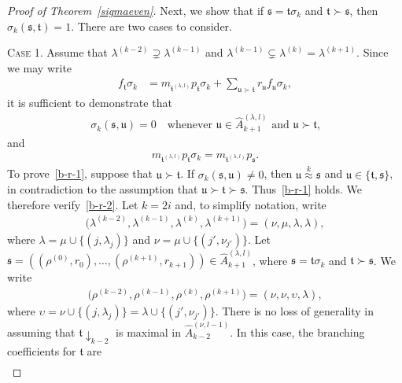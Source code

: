 \documentclass[11pt,a4paper,reqno,svgnames]{amsart}
\theoremstyle{plain}
\theoremstyle{definition}
\numberwithin{equation}{section}
\begin{document}
\begin{proof}[Proof of Theorem~\ref{sigmaeven}]
Next, we show that if $\mathfrak{s}=\mathfrak{t}\sigma_{k}$ and $\mathfrak{t}\succ\mathfrak{s}$, then $\sigma_{k}(\mathfrak{s},\mathfrak{t})=1$. There are two cases to consider.

{\textsc{Case 1.}} Assume that $\lambda^{(k-2)}\supsetneq\lambda^{(k-1)}$ and $\lambda^{(k-1)}\subsetneq\lambda^{(k)}=\lambda^{(k+1)}$. Since we may write
\begin{align*}
f_\mathfrak{t} \sigma_{k}&=
m_{\mathfrak{t}^{(\lambda,l)}} p_\mathfrak{t}\sigma_{k}+
\sum_{\mathfrak{u}\succ\mathfrak{t}}r_\mathfrak{u}f_\mathfrak{u} \sigma_{k},
\end{align*}
it is sufficient to demonstrate that
\begin{align}\label{b-r-1}
\sigma_{k}(\mathfrak{s,u})=0
\quad\text{whenever $\mathfrak{u}\in\hat{A}_{k+1}^{(\lambda, l )}$ and $\mathfrak{u}\succ\mathfrak{t}$,}
\end{align}
and 
\begin{align}\label{b-r-2}
m_{\mathfrak{t}^{(\lambda,l)}} p_\mathfrak{t}\sigma_{k}=
m_{\mathfrak{t}^{(\lambda,l)}} p_\mathfrak{s}.
\end{align}
To prove~\eqref{b-r-1}, suppose that $\mathfrak{u}\succ\mathfrak{t}$. If $\sigma_{k}(\mathfrak{s},\mathfrak{u})\ne0$, then $\mathfrak{u}\stackrel{k}{\approx}\mathfrak{s}$ and  $\mathfrak{u}\in{\lbrace}\mathfrak{t},\mathfrak{s}{\rbrace}$, in contradiction to the assumption that  $\mathfrak{u}\succ\mathfrak{t}\succ\mathfrak{s}$. Thus~\eqref{b-r-1} holds. We therefore verify~\eqref{b-r-2}. Let $k=2i$ and, to simplify notation, write 
\begin{align*} 
\big(\lambda^{(k-2)},\lambda^{(k-1)},\lambda^{(k)},\lambda^{(k+1)}\big)=(\nu,\mu,\lambda,\lambda),
\end{align*}
where $\lambda=\mu\cup{\lbrace}(j,\lambda_j){\rbrace}$ and $\nu=\mu\cup{\lbrace}({j'},\nu_{j'}){\rbrace}$. Let $\mathfrak{s}=((\rho^{(0)},r_0),\ldots,(\rho^{(k+1)},r_{k+1}))\in \hat{A}_{k+1}^{(\lambda,l)}$, where $\mathfrak{s}=\mathfrak{t}\sigma_k$ and $\mathfrak{t}\succ\mathfrak{s}$. We write 
\begin{align*}
\big(\rho^{(k-2)},\rho^{(k-1)},\rho^{(k)},\rho^{(k+1)}\big)
=(\nu,\nu,\upsilon,\lambda),
\end{align*}
where $\upsilon=\nu\cup{\lbrace}(j,\lambda_j){\rbrace}=\lambda\cup{\lbrace}({j'},\nu_{j'}){\rbrace}$. There is no loss of generality in assuming that $\mathfrak{t}\downarrow_{k-2}$ is maximal in $\hat{A}_{k-2}^{(\nu,l-1)}$. In this case, the branching coefficients for $\mathfrak{t}$ are 
\begin{align*}

\end{align*}
\end{proof}
\end{document}
